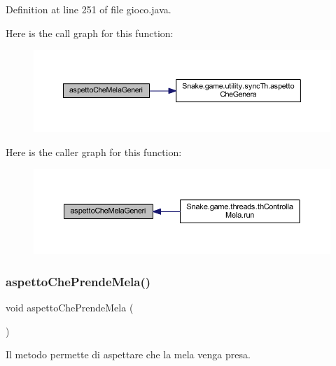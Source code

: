 Definition at line 251 of file gioco.\+java.

Here is the call graph for this function\+:
\nopagebreak
\begin{figure}[H]
\begin{center}
\leavevmode
\includegraphics[width=350pt]{class_snake_1_1game_1_1gioco_a6eb3176cbeae2780913116900dd2d141_cgraph}
\end{center}
\end{figure}
Here is the caller graph for this function\+:
\nopagebreak
\begin{figure}[H]
\begin{center}
\leavevmode
\includegraphics[width=350pt]{class_snake_1_1game_1_1gioco_a6eb3176cbeae2780913116900dd2d141_icgraph}
\end{center}
\end{figure}
\mbox{\label{class_snake_1_1game_1_1gioco_afe08c48d1322583ee9398d56ac218afa}} 
\subsubsection{\texorpdfstring{aspetto\+Che\+Prende\+Mela()}{aspettoChePrendeMela()}}
{\footnotesize\ttfamily void aspetto\+Che\+Prende\+Mela (\begin{DoxyParamCaption}{ }\end{DoxyParamCaption})}



Il metodo permette di aspettare che la mela venga presa. 



